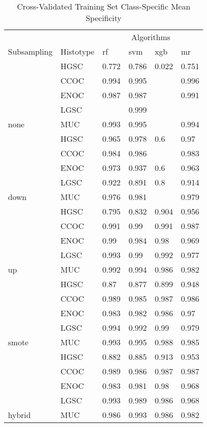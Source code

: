 \documentclass[
]{report}
\begin{document}
\begin{table}

\caption{\label{tab:train-spec-class-table}Cross-Validated Training Set Class-Specific Mean Specificity}
\centering
\begin{tabular}[t]{l|l|l|l|l|l}
\hline
\multicolumn{2}{c|}{ } & \multicolumn{4}{c}{Algorithms} \\
\cline{3-6}
Subsampling & Histotype & rf & svm & xgb & mr\\
\hline
 & HGSC & 0.772 & 0.786 & 0.022 & 0.751\\
\cline{2-6}
 & CCOC & 0.994 & 0.995 & \cellcolor[HTML]{90ee90}{1} & 0.996\\
\cline{2-6}
 & ENOC & 0.987 & 0.987 & \cellcolor[HTML]{90ee90}{1} & 0.991\\
\cline{2-6}
 & LGSC & \cellcolor[HTML]{90ee90}{1} & 0.999 & \cellcolor[HTML]{90ee90}{1} & \cellcolor[HTML]{90ee90}{1}\\
\cline{2-6}
\multirow{-5}{*}{\raggedright\arraybackslash none} & MUC & 0.993 & 0.995 & \cellcolor[HTML]{90ee90}{1} & 0.994\\
\cline{1-6}
 & HGSC & 0.965 & 0.978 & 0.6 & 0.97\\
\cline{2-6}
 & CCOC & 0.984 & 0.986 & \cellcolor[HTML]{90ee90}{1} & 0.983\\
\cline{2-6}
 & ENOC & 0.973 & 0.937 & 0.6 & 0.963\\
\cline{2-6}
 & LGSC & 0.922 & 0.891 & 0.8 & 0.914\\
\cline{2-6}
\multirow{-5}{*}{\raggedright\arraybackslash down} & MUC & 0.976 & 0.981 & \cellcolor[HTML]{90ee90}{1} & 0.979\\
\cline{1-6}
 & HGSC & 0.795 & 0.832 & 0.904 & 0.956\\
\cline{2-6}
 & CCOC & 0.991 & 0.99 & 0.991 & 0.987\\
\cline{2-6}
 & ENOC & 0.99 & 0.984 & 0.98 & 0.969\\
\cline{2-6}
 & LGSC & 0.993 & 0.99 & 0.992 & 0.977\\
\cline{2-6}
\multirow{-5}{*}{\raggedright\arraybackslash up} & MUC & 0.992 & 0.994 & 0.986 & 0.982\\
\cline{1-6}
 & HGSC & 0.87 & 0.877 & 0.899 & 0.948\\
\cline{2-6}
 & CCOC & 0.989 & 0.985 & 0.987 & 0.986\\
\cline{2-6}
 & ENOC & 0.983 & 0.982 & 0.986 & 0.97\\
\cline{2-6}
 & LGSC & 0.994 & 0.992 & 0.99 & 0.979\\
\cline{2-6}
\multirow{-5}{*}{\raggedright\arraybackslash smote} & MUC & 0.993 & 0.995 & 0.988 & 0.985\\
\cline{1-6}
 & HGSC & 0.882 & 0.885 & 0.913 & 0.953\\
\cline{2-6}
 & CCOC & 0.989 & 0.986 & 0.987 & 0.987\\
\cline{2-6}
 & ENOC & 0.983 & 0.981 & 0.98 & 0.968\\
\cline{2-6}
 & LGSC & 0.993 & 0.989 & 0.986 & 0.968\\
\cline{2-6}
\multirow{-5}{*}{\raggedright\arraybackslash hybrid} & MUC & 0.986 & 0.993 & 0.986 & 0.982\\
\hline
\end{tabular}
\end{table}
\end{document}
